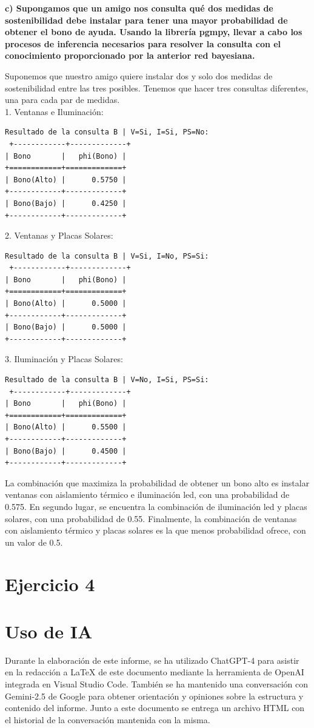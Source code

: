 \documentclass[11pt,a4paper]{article}
\begin{document}
\textbf{c) Supongamos que un amigo nos consulta qué dos medidas de sostenibilidad debe instalar para tener una
mayor probabilidad de obtener el bono de ayuda. Usando la librería pgmpy, llevar a cabo los procesos de
inferencia necesarios para resolver la consulta con el conocimiento proporcionado por la anterior red
bayesiana.}

Suponemos que nuestro amigo quiere instalar dos y solo dos medidas de sostenibilidad entre las tres posibles. 
Tenemos que hacer tres consultas diferentes, una para cada par de medidas. \\

1. Ventanas e Iluminación:
\begin{verbatim}
Resultado de la consulta B | V=Si, I=Si, PS=No:
 +------------+-------------+
| Bono       |   phi(Bono) |
+============+=============+
| Bono(Alto) |      0.5750 |
+------------+-------------+
| Bono(Bajo) |      0.4250 |
+------------+-------------+ 
\end{verbatim}

2. Ventanas y Placas Solares:
\begin{verbatim}
Resultado de la consulta B | V=Si, I=No, PS=Si:
 +------------+-------------+
| Bono       |   phi(Bono) |
+============+=============+
| Bono(Alto) |      0.5000 |
+------------+-------------+
| Bono(Bajo) |      0.5000 |
+------------+-------------+ 
\end{verbatim}

3. Iluminación y Placas Solares:
\begin{verbatim}
Resultado de la consulta B | V=No, I=Si, PS=Si:
 +------------+-------------+
| Bono       |   phi(Bono) |
+============+=============+
| Bono(Alto) |      0.5500 |
+------------+-------------+
| Bono(Bajo) |      0.4500 |
+------------+-------------+ 
\end{verbatim}

La combinación que maximiza la probabilidad de obtener un bono alto es instalar ventanas con aislamiento térmico e iluminación led, con una probabilidad de 0.575.
En segundo lugar, se encuentra la combinación de iluminación led y placas solares, con una probabilidad de 0.55. Finalmente, la combinación de ventanas con aislamiento térmico y placas solares es la que menos probabilidad ofrece, con un valor de 0.5.

\section{Ejercicio 4}



\clearpage
\section*{Uso de IA}
Durante la elaboración de este informe, se ha utilizado ChatGPT-4 para asistir en la redacción a LaTeX de este documento
mediante la herramienta de OpenAI integrada en Visual Studio Code. También se ha mantenido una conversación 
con Gemini-2.5 de Google para obtener orientación y opiniones sobre la estructura y contenido del informe.
Junto a este documento se entrega un archivo HTML con el historial de la conversación mantenida con la misma.

\clearpage
\printbibliography
\end{document}
